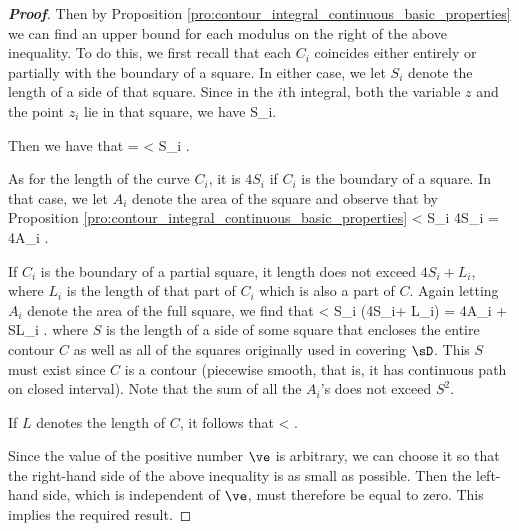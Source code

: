 \begin{proof}[\bf Proof]
Then by Proposition \ref{pro:contour_integral_continuous_basic_properties} we can find an upper bound for each modulus on the right of the above inequality. To do this, we first recall that each $C_i$ coincides either entirely or partially with the boundary of a square. In either case, we let $S_i$ denote the length of a side of that square. Since in the $i$th integral, both the variable $z$ and the point $z_i$ lie in that square, we have
\be
{} \leq {}S_i.
\ee

Then we have that 
\be
{} =  < S_i \ve.
\ee

As for the length of the curve $C_i$, it is $4S_i$ if $C_i$ is the boundary of a square. In that case, we let $A_i$ denote the area of the square and observe that by  Proposition \ref{pro:contour_integral_continuous_basic_properties}
\be
{} < S_i \ve \cdot 4S_i = 4A_i \ve.
\ee

If $C_i$ is the boundary of a partial square, it length does not exceed $4S_i+ L_i$, where $L_i$ is the length of that part of $C_i$ which is also a part of $C$. Again letting $A_i$ denote the area of the full square, we find that
\be
{} < S_i \ve \cdot (4S_i+ L_i) = 4A_i \ve + SL_i \ve.
\ee
where $S$ is the length of a side of some square that encloses the entire contour $C$ as well as all of the squares originally used in covering $\sD$. This $S$ must exist since $C$ is a contour (piecewise smooth, that is, it has continuous path on closed interval). Note that the sum of all the $A_i$'s does not exceed $S^2$.

If $L$ denotes the length of $C$, it follows that 
\be
{} < \ve.
\ee

Since the value of the positive number $\ve$ is arbitrary, we can choose it so that the right-hand side of the above inequality is as small as possible. Then the left-hand side, which is independent of $\ve$, must therefore be equal to zero. This implies the required result.
\end{proof}

